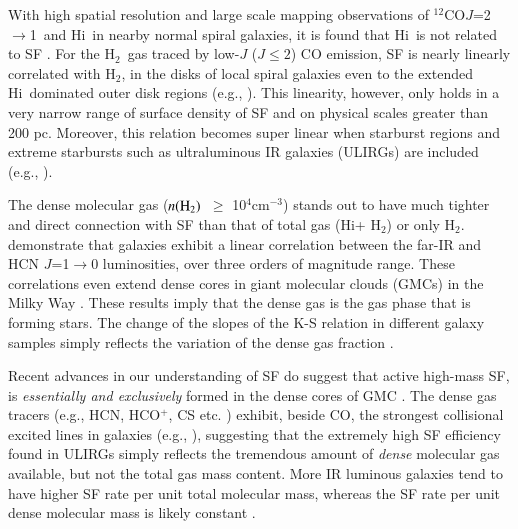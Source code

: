 \documentclass[legal,11pt]{article}
\def\cmt   {cm$^{-3}$\,}
\def\,{\thinspace}
\def\HI{H{\sc i}}
\def\Htwo{H$_2$}
\def\nHtwo{$n({\rm H}_2)$}
\def\Htwo       {H$_2$}
\def\COto      {$^{12}$CO$J$=2$\rightarrow$1}
\begin{document}
With high spatial resolution and large scale mapping observations of \COto\ and
\HI\ in nearby normal spiral galaxies, it is found that \HI\ is not related to
SF \citep[e.g.,][]{Bigiel2008}. For the \Htwo\ gas traced by low-$J$ ($J\le2$)
CO emission, SF is nearly linearly correlated with \Htwo, in the disks of local
spiral galaxies even to the extended \HI\ dominated outer disk
regions (e.g., \citealt{Bigiel2008,Schruba2011,Leroy2013}). This linearity,
however, only holds in a very narrow range of surface density of SF and on
physical scales greater than 200 pc.  Moreover, this relation becomes super
linear when starburst regions and extreme starbursts such as ultraluminous
IR galaxies (ULIRGs) are included (e.g.,
\citealt{Genzel2010,Daddi2010a}).  


The dense molecular gas (\nHtwo\ $\ge$ 10$^4$\cmt) stands out to have much
tighter and direct connection with SF than that of total gas (\HI + \Htwo) or
only \Htwo. \citet[][Fig. 2]{gs04a,gs04b} demonstrate that galaxies exhibit a
linear correlation between the far-IR and HCN $J$=1$\rightarrow$0 luminosities,
over three orders of magnitude range. These correlations even extend dense
cores in giant molecular clouds (GMCs) in the Milky Way \citep{weg05,zgh2014}.
These results imply that the dense gas is the gas phase that is forming
stars. The change of the slopes of the K-S relation in different galaxy samples
simply reflects the variation of the dense gas fraction \citep[e.g.,][]{Lada2010b}. 

Recent advances in our understanding of SF do suggest that active high-mass SF,
is {\it essentially and exclusively} formed in the dense cores of GMC
\citep[e.g.,][]{Evans08}. The dense gas tracers (e.g., HCN, HCO$^+$, CS etc. )
exhibit, beside CO, the strongest collisional excited lines in galaxies (e.g.,
\citealt{rwc06,gc08,Baan08,Greve14}), suggesting that the extremely high SF
efficiency found in ULIRGs simply reflects the tremendous amount of {\it dense}
molecular gas available, but not the total gas mass
content\citep[e.g.,][]{Lada2010b}.  More IR luminous galaxies tend to have
higher SF rate per unit total molecular mass, whereas the SF rate per unit
dense molecular mass is likely constant \citep[][]{gs04a,gs04b}.
\end{document}
